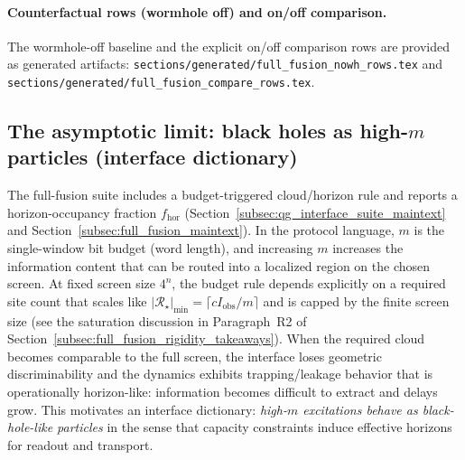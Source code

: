 \paragraph{Counterfactual rows (wormhole off) and on/off comparison.}
\AuditTag The wormhole-off baseline and the explicit on/off comparison rows are provided as generated artifacts:
\texttt{sections/generated/full\_fusion\_nowh\_rows.tex} and \texttt{sections/generated/full\_fusion\_compare\_rows.tex}.

\subsection{The asymptotic limit: black holes as high-\texorpdfstring{$m$}{m} particles (interface dictionary)}
\label{subsec:bh_high_m_particles}
The full-fusion suite includes a budget-triggered cloud/horizon rule and reports a horizon-occupancy fraction $f_{\mathrm{hor}}$ (Section~\ref{subsec:qg_interface_suite_maintext} and Section~\ref{subsec:full_fusion_maintext}).
In the protocol language, $m$ is the single-window bit budget (word length), and increasing $m$ increases the information content that can be routed into a localized region on the chosen screen.
At fixed screen size $4^n$, the budget rule depends explicitly on a required site count that scales like $|{\mathcal R}_\star|_{\min}=\lceil cI_{\mathrm{obs}}/m\rceil$ and is capped by the finite screen size (see the saturation discussion in Paragraph~R2 of Section~\ref{subsec:full_fusion_rigidity_takeaways}).
When the required cloud becomes comparable to the full screen, the interface loses geometric discriminability and the dynamics exhibits trapping/leakage behavior that is operationally horizon-like: information becomes difficult to extract and delays grow.
This motivates an interface dictionary: \emph{high-$m$ excitations behave as black-hole-like particles} in the sense that capacity constraints induce effective horizons for readout and transport.

